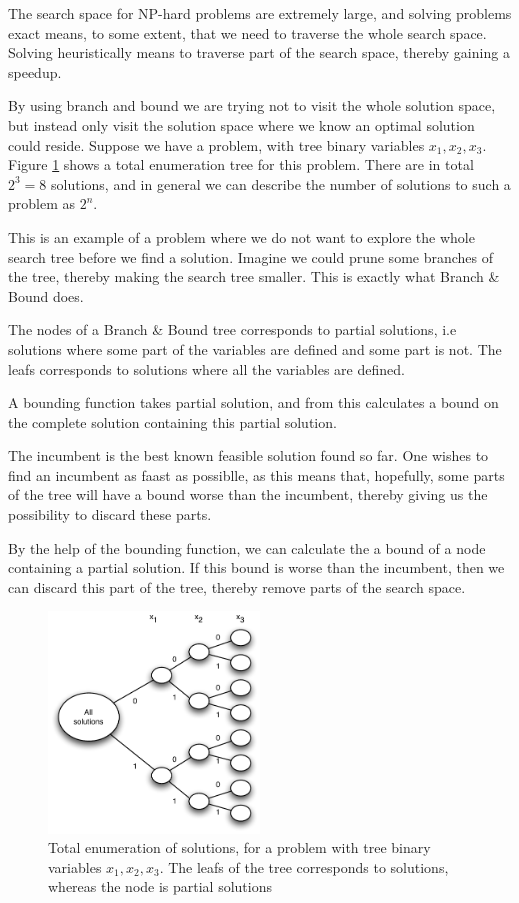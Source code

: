 \documentclass[10pt]{article}
\begin{document}
The search space for NP-hard problems are extremely large, and solving problems exact means, to some extent, that we need to traverse the whole search space. Solving heuristically means to traverse part of the search space, thereby gaining a speedup. 

By using branch and bound we are trying not to visit the whole solution space, but instead only visit the solution space where we know an optimal solution could reside. Suppose we have a problem, with tree binary variables $x_1, x_2, x_3$. Figure \ref{fig21} shows a total enumeration tree for this problem. There are in total $2^3 = 8$ solutions, and in general we can describe the number of solutions to such a problem as $2^n$.

This is an example of a problem where we do not want to explore the whole search tree before we find a solution. Imagine we could prune some branches of the tree, thereby making the search tree smaller. This is exactly what Branch \& Bound does.

The nodes of a Branch \& Bound tree corresponds to partial solutions, i.e solutions where some part of the variables are defined and some part is not. The leafs corresponds to solutions where all the variables are defined.

A bounding function takes partial solution, and from this calculates a bound on the complete solution containing this partial solution.

The incumbent is the best known feasible solution found so far. One wishes to find an incumbent as faast as possiblle, as this means that, hopefully, some parts of the tree will have a bound worse than the incumbent, thereby giving us the possibility to discard these parts.

By the help of the bounding function, we can calculate the a bound of a node containing a partial solution. If this bound is worse than the incumbent, then we can discard this part of the tree, thereby remove parts of the search space.

\begin{figure}[ht]
\centering
\includegraphics[width=0.5\textwidth]{figures/fig21.pdf}
\caption{Total enumeration of solutions, for a problem with tree binary variables $x_1, x_2, x_3$. The leafs of the tree corresponds to solutions, whereas the node is partial solutions}
\label{fig21}
\end{figure}
\end{document}
